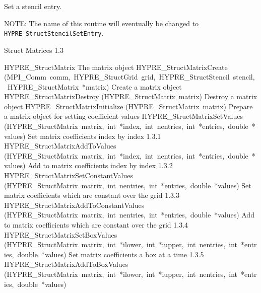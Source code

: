 \documentclass{article}
\begin{document}
\begin{cxxentry}
\begin{cxxentry}
\begin{cxxfunction}
\begin{cxxdoc}
Set a stencil entry.

NOTE: The name of this routine will eventually be changed to {\tt
HYPRE\_StructStencilSetEntry}.
\end{cxxdoc}
\end{cxxfunction}
\end{cxxentry}
\begin{cxxentry}
{}
        {Struct Matrices}
        {}
        {
}
        {1.3}
\begin{cxxnames}
        {HYPRE\_StructMatrix}
        {}
        {
The matrix object}
        {}
\label{cxx.1.3.13}
        {HYPRE\_StructMatrixCreate}
        {(MPI\_Comm\ comm,\ HYPRE\_StructGrid\ grid,\ HYPRE\_StructStencil\ stencil,\ HYPRE\_StructMatrix\ *matrix)}
        {
Create a matrix object}
        {}
\label{cxx.1.3.14}
        {HYPRE\_StructMatrixDestroy}
        {(HYPRE\_StructMatrix\ matrix)}
        {
Destroy a matrix object}
        {}
\label{cxx.1.3.15}
        {HYPRE\_StructMatrixInitialize}
        {(HYPRE\_StructMatrix\ matrix)}
        {
Prepare a matrix object for setting coefficient values}
        {}
\label{cxx.1.3.16}
        {HYPRE\_StructMatrixSetValues}
        {(HYPRE\_StructMatrix\ matrix,\ int\ *index,\ int\ nentries,\ int\ *entries,\ double\ *values)}
        {
Set matrix coefficients index by index}
        {1.3.1}
        {HYPRE\_StructMatrixAddToValues}
        {(HYPRE\_StructMatrix\ matrix,\ int\ *index,\ int\ nentries,\ int\ *entries,\ double\ *values)}
        {
Add to matrix coefficients index by index}
        {1.3.2}
        {HYPRE\_StructMatrixSetConstantValues}
        {(HYPRE\_StructMatrix\ matrix,\ int\ nentries,\ int\ *entries,\ double\ *values)}
        {
Set matrix coefficients which are constant over the grid}
        {1.3.3}
        {HYPRE\_StructMatrixAddToConstantValues}
        {(HYPRE\_StructMatrix\ matrix,\ int\ nentries,\ int\ *entries,\ double\ *values)}
        {
Add to matrix coefficients which are constant over the grid}
        {1.3.4}
        {HYPRE\_StructMatrixSetBoxValues}
        {(HYPRE\_StructMatrix\ matrix,\ int\ *ilower,\ int\ *iupper,\ int\ nentries,\ int\ *entries,\ double\ *values)}
        {
Set matrix coefficients a box at a time}
        {1.3.5}
        {HYPRE\_StructMatrixAddToBoxValues}
        {(HYPRE\_StructMatrix\ matrix,\ int\ *ilower,\ int\ *iupper,\ int\ nentries,\ int\ *entries,\ double\ *values)}

\end{cxxnames}
\end{cxxentry}
\end{cxxentry}
\end{document}
